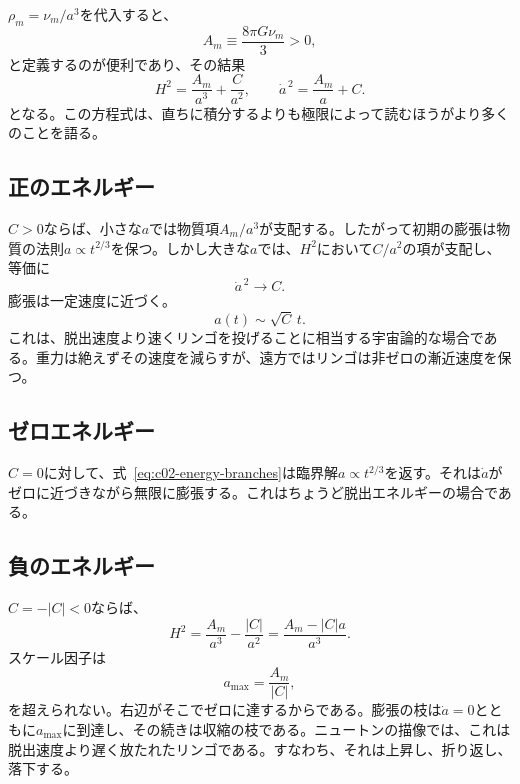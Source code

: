 \(\rho_m=\nu_m/a^3\)を代入すると、
\begin{equation}
A_m\equiv\frac{8\pi G\nu_m}{3}>0,
\end{equation}
と定義するのが便利であり、その結果
\begin{equation}
H^2=\frac{A_m}{a^3}+\frac{C}{a^2},
\qquad
\dot a^{\,2}=\frac{A_m}{a}+C.
\label{eq:c02-energy-branches}
\end{equation}
となる。この方程式は、直ちに積分するよりも極限によって読むほうがより多くのことを語る。

\subsection{正のエネルギー}

\(C>0\)ならば、小さな\(a\)では物質項\(A_m/a^3\)が支配する。したがって初期の膨張は物質の法則\(a\propto t^{2/3}\)を保つ。しかし大きな\(a\)では、\(H^2\)において\(C/a^2\)の項が支配し、等価に
\begin{equation}
\dot a^{\,2}\longrightarrow C.
\end{equation}
膨張は一定速度に近づく。
\begin{equation}
a(t)\sim\sqrt C\,t.
\label{eq:c02-positive-late}
\end{equation}
これは、脱出速度より速くリンゴを投げることに相当する宇宙論的な場合である。重力は絶えずその速度を減らすが、遠方ではリンゴは非ゼロの漸近速度を保つ。

\subsection{ゼロエネルギー}

\(C=0\)に対して、式~\eqref{eq:c02-energy-branches}は臨界解\(a\propto t^{2/3}\)を返す。それは\(\dot a\)がゼロに近づきながら無限に膨張する。これはちょうど脱出エネルギーの場合である。

\subsection{負のエネルギー}

\(C=-|C|<0\)ならば、
\begin{equation}
H^2=\frac{A_m}{a^3}-\frac{|C|}{a^2}
=\frac{A_m-|C|a}{a^3}.
\label{eq:c02-negative-energy}
\end{equation}
スケール因子は
\begin{equation}
a_{\max}=\frac{A_m}{|C|},
\label{eq:c02-amax}
\end{equation}
を超えられない。右辺がそこでゼロに達するからである。膨張の枝は\(\dot a=0\)とともに\(a_{\max}\)に到達し、その続きは収縮の枝である。ニュートンの描像では、これは脱出速度より遅く放たれたリンゴである。すなわち、それは上昇し、折り返し、落下する。

